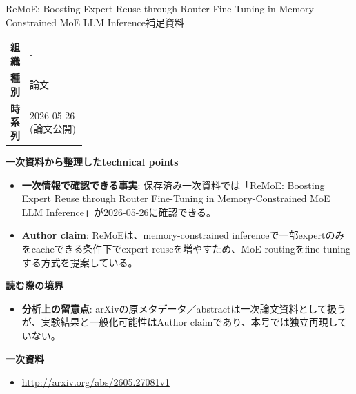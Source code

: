 \begin{technicalnote}{ReMoE: Boosting Expert Reuse through Router Fine-Tuning in Memory-Constrained MoE LLM Inference}{補足資料}
\begingroup
\begin{tabularx}{\linewidth}{@{}>{\bfseries}p{0.22\linewidth}X@{}}
組織 & - \\
種別 & 論文 \\
時系列 & 2026-05-26 (論文公開) \\
\end{tabularx}
\smallskip
{\bfseries 一次資料から整理したtechnical points}
\begin{itemize}[leftmargin=1.5em,itemsep=0.35em]
\item \textbf{一次情報で確認できる事実}: 保存済み一次資料では「ReMoE: Boosting Expert Reuse through Router Fine-Tuning in Memory-Constrained MoE LLM Inference」が2026-05-26に確認できる。
\item \textbf{Author claim}: ReMoEは、memory-constrained inferenceで一部expertのみをcacheできる条件下でexpert reuseを増やすため、MoE routingをfine-tuningする方式を提案している。
\end{itemize}
{\bfseries 読む際の境界}
\begin{itemize}[leftmargin=1.5em,itemsep=0.35em]
\item \textbf{分析上の留意点}: arXivの原メタデータ／abstractは一次論文資料として扱うが、実験結果と一般化可能性はAuthor claimであり、本号では独立再現していない。
\end{itemize}
\begin{samepage}
{\bfseries 一次資料}
\begingroup\sloppy
\begin{itemize}[leftmargin=1.5em,itemsep=0.25em]
\item {\scriptsize\url{http://arxiv.org/abs/2605.27081v1}}
\end{itemize}
\endgroup
\end{samepage}
\endgroup
\end{technicalnote}
\medskip
